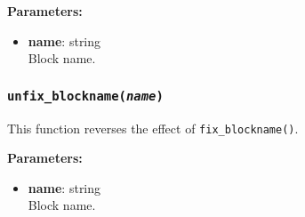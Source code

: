 \textbf{Parameters:}
\begin{itemize}
\item \textbf{name}: string\\
  Block name.
\end{itemize}

\subsubsection{\texttt{unfix\_blockname(\emph{name})}}

This function reverses the effect of \texttt{fix\_blockname()}.

\textbf{Parameters:}
\begin{itemize}
\item \textbf{name}: string\\
  Block name.
\end{itemize}

